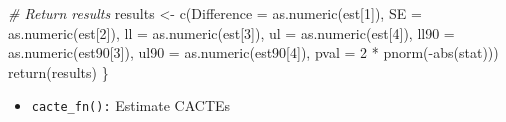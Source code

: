 \documentclass[
]{article}
\newenvironment{Shaded}{\begin{snugshade}}{\end{snugshade}}
\newcommand{\AttributeTok}[1]{\textcolor[rgb]{0.77,0.63,0.00}{#1}}
\newcommand{\CommentTok}[1]{\textcolor[rgb]{0.56,0.35,0.01}{\textit{#1}}}
\newcommand{\DecValTok}[1]{\textcolor[rgb]{0.00,0.00,0.81}{#1}}
\newcommand{\FunctionTok}[1]{\textcolor[rgb]{0.00,0.00,0.00}{#1}}
\newcommand{\NormalTok}[1]{#1}
\newcommand{\OtherTok}[1]{\textcolor[rgb]{0.56,0.35,0.01}{#1}}
\newcommand{\SpecialCharTok}[1]{\textcolor[rgb]{0.00,0.00,0.00}{#1}}
\providecommand{\tightlist}{%
  \setlength{\itemsep}{0pt}\setlength{\parskip}{0pt}}
\begin{document}
\begin{Shaded}
\begin{Highlighting}[]
  \CommentTok{\# Return results}
\NormalTok{  results }\OtherTok{\textless{}{-}} \FunctionTok{c}\NormalTok{(}\AttributeTok{Difference =} \FunctionTok{as.numeric}\NormalTok{(est[}\DecValTok{1}\NormalTok{]), }
              \AttributeTok{SE =} \FunctionTok{as.numeric}\NormalTok{(est[}\DecValTok{2}\NormalTok{]), }
              \AttributeTok{ll =} \FunctionTok{as.numeric}\NormalTok{(est[}\DecValTok{3}\NormalTok{]), }\AttributeTok{ul =} \FunctionTok{as.numeric}\NormalTok{(est[}\DecValTok{4}\NormalTok{]), }
              \AttributeTok{ll90 =} \FunctionTok{as.numeric}\NormalTok{(est90[}\DecValTok{3}\NormalTok{]), }\AttributeTok{ul90 =} \FunctionTok{as.numeric}\NormalTok{(est90[}\DecValTok{4}\NormalTok{]),}
              \AttributeTok{pval =} \DecValTok{2} \SpecialCharTok{*} \FunctionTok{pnorm}\NormalTok{(}\SpecialCharTok{{-}}\FunctionTok{abs}\NormalTok{(stat)))}
  \FunctionTok{return}\NormalTok{(results)}
\NormalTok{\}}
\end{Highlighting}
\end{Shaded}

\begin{itemize}
\tightlist
\item
  \texttt{cacte\_fn():} Estimate CACTEs
\end{itemize}
\end{document}
